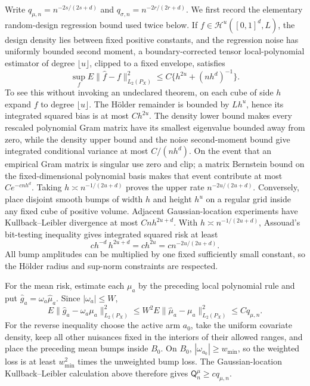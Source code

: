 Write \(q_{\mu,n}=n^{-2s/(2s+d)}\) and \(q_{\sigma,n}=n^{-2r/(2r+d)}\).  We first record the elementary random-design regression bound used twice below.  If \(f\in\mathcal H^u([0,1]^d,L)\), the design density lies between fixed positive constants, and the regression noise has uniformly bounded second moment, a boundary-corrected tensor local-polynomial estimator of degree \(\lfloor u\rfloor\), clipped to a fixed envelope, satisfies
\[
\sup_f E\|\widehat f-f\|_{L_2(P_X)}^2
\leq C\{h^{2u}+(nh^d)^{-1}\}.
\]
To see this without invoking an undeclared theorem, on each cube of side \(h\) expand \(f\) to degree \(\lfloor u\rfloor\).  The Hölder remainder is bounded by \(Lh^u\), hence its integrated squared bias is at most \(C h^{2u}\).  The density lower bound makes every rescaled polynomial Gram matrix have its smallest eigenvalue bounded away from zero, while the density upper bound and the noise second-moment bound give integrated conditional variance at most \(C/(nh^d)\).  On the event that an empirical Gram matrix is singular use zero and clip; a matrix Bernstein bound on the fixed-dimensional polynomial basis makes that event contribute at most \(Ce^{-cnh^d}\).  Taking \(h\asymp n^{-1/(2u+d)}\) proves the upper rate \(n^{-2u/(2u+d)}\).  Conversely, place disjoint smooth bumps of width \(h\) and height \(h^u\) on a regular grid inside any fixed cube of positive volume.  Adjacent Gaussian-location experiments have Kullback--Leibler divergence at most \(Cn h^{2u+d}\).  With \(h\asymp n^{-1/(2u+d)}\), Assouad's bit-testing inequality gives integrated squared risk at least
\[
c h^{-d}\,h^{2u+d}=c h^{2u}=c n^{-2u/(2u+d)}.
\]
All bump amplitudes can be multiplied by one fixed sufficiently small constant, so the Hölder radius and sup-norm constraints are respected.

For the mean risk, estimate each \(\mu_a\) by the preceding local polynomial rule and put \(\widehat g_a=\omega_a\widehat\mu_a\).  Since \(|\omega_a|\leq W\),
\[
E\|\widehat g_a-\omega_a\mu_a\|_{L_2(P_X)}^2
\leq W^2E\|\widehat\mu_a-\mu_a\|_{L_2(P_X)}^2
\leq Cq_{\mu,n}.
\]
For the reverse inequality choose the active arm \(a_0\), take the uniform covariate density, keep all other nuisances fixed in the interiors of their allowed ranges, and place the preceding mean bumps inside \(B_0\).  On \(B_0\), \(|\omega_{a_0}|\geq w_{\min}\), so the weighted loss is at least \(w_{\min}^2\) times the unweighted bump loss.  The Gaussian-location Kullback--Leibler calculation above therefore gives \(\mathsf Q_n^{\mu}\geq c q_{\mu,n}\).

